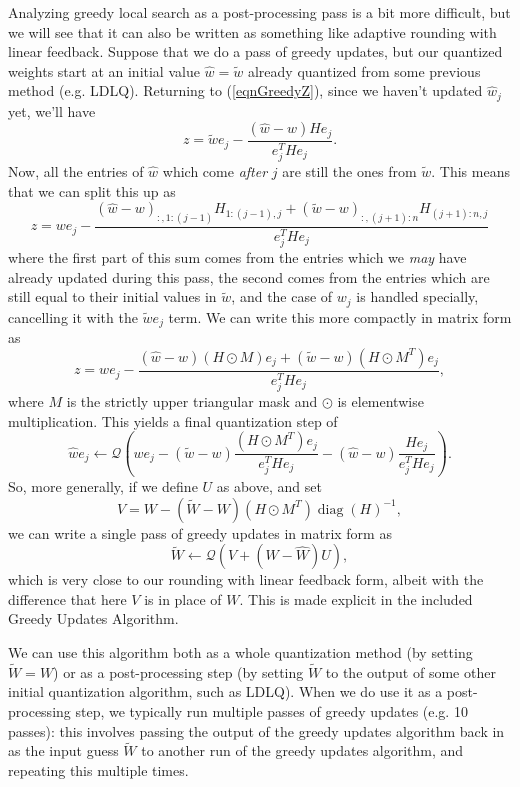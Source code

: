 Analyzing greedy local search as a post-processing pass is a bit more difficult, but we will see that it can also be written as something like adaptive rounding with linear feedback. Suppose that we do a pass of greedy updates, but our quantized weights start at an initial value $\hat w = \tilde w$ already quantized from some previous method (e.g. LDLQ). Returning to (\ref{eqnGreedyZ}), since we haven't updated $\hat w_j$ yet, we'll have
\[
    z =
    \tilde w e_j -
    \frac{
        (\hat w - w) H e_j }{ e_j^T H e_j }.
\]
Now, all the entries of $\hat w $ which come \emph{after} $j$ are still the ones from $\tilde w$. This means that we can split this up as
\[
    z = w e_j -
    \frac{
        (\hat w - w)_{:,1:(j-1)} H_{1:(j-1),j} +
        (\tilde w - w)_{:,(j+1):n} H_{(j+1):n,j} }{ e_j^T H e_j }
\]
where the first part of this sum comes from the entries which we \emph{may} have already updated during this pass, the second comes from the entries which are still equal to their initial values in $\tilde w$, and the case of $w_j$ is handled specially, cancelling it with the $\tilde w e_j$ term. We can write this more compactly in matrix form as
\[
    z = w e_j -
    \frac{
        (\hat w - w) (H \odot M) e_j +
        (\tilde w - w) (H \odot M^T) e_j }{ e_j^T H e_j },
\]
where $M$ is the strictly upper triangular mask and $\odot$ is elementwise multiplication. This yields a final quantization step of
\[
    \hat w e_j \gets \mathcal{Q}\left( w e_j - (\tilde w - w) \frac{
        (H \odot M^T) e_j }{ e_j^T H e_j } - 
    (\hat w - w) \frac{
        H e_j }{ e_j^T H e_j } \right).
\]
So, more generally, if we define $U$ as above, and set
\[
    V = W - (\tilde W - W) (H \odot M^T) \operatorname{diag}(H)^{-1},
\]
we can write a single pass of greedy updates in matrix form as
\[
    \tilde W \gets \mathcal{Q}( V + (W - \hat W) U ),
\]
which is very close to our rounding with linear feedback form, albeit with the difference that here $V$ is in place of $W$. This is made explicit in the included Greedy Updates Algorithm.

We can use this algorithm both as a whole quantization method (by setting $\tilde W = W$) or as a post-processing step (by setting $\tilde W$ to the output of some other initial quantization algorithm, such as LDLQ). When we do use it as a post-processing step, we typically run multiple passes of greedy updates (e.g. 10 passes): this involves passing the output of the greedy updates algorithm back in as the input guess $\tilde W$ to another run of the greedy updates algorithm, and repeating this multiple times.

